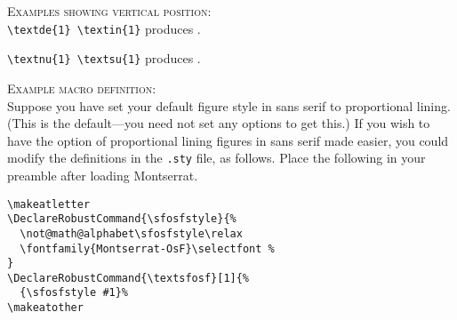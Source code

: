 \documentclass[11pt]{article}
\begin{document}
\textsc{Examples showing vertical position:}\\
\verb|\textde{1} \textin{1}|  produces   .
 
\verb|\textnu{1} \textsu{1}|  produces   . 



\textsc{Example macro definition:}\\
Suppose you have set your default figure style in sans serif to proportional lining. (This is the default---you need not set any options to get this.) If you wish to have the option of proportional lining figures in sans serif made easier, you could modify the definitions in the {\tt.sty} file, as follows. Place the following in your preamble after loading Montserrat.
\begin{verbatim}
\makeatletter
\DeclareRobustCommand{\sfosfstyle}{%
  \not@math@alphabet\sfosfstyle\relax
  \fontfamily{Montserrat-OsF}\selectfont %
}
\DeclareRobustCommand{\textsfosf}[1]{%
  {\sfosfstyle #1}%
\makeatother
\end{verbatim}
\end{document}
